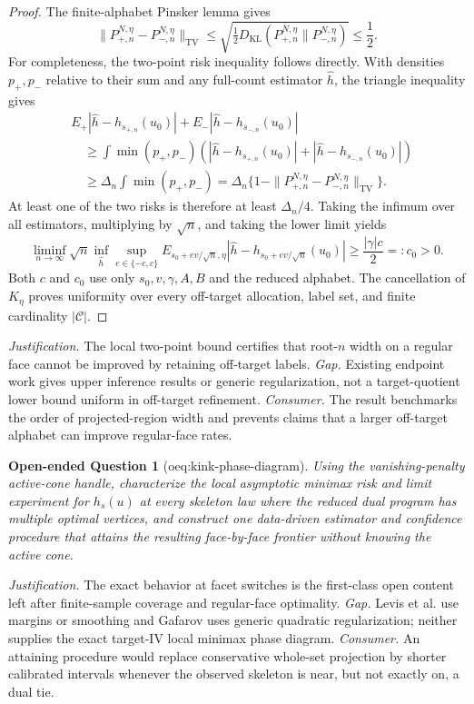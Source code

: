 \documentclass{article}
\newtheorem{openendedquestion}{Open-ended Question}
\begin{document}
\begin{proof}
The finite-alphabet Pinsker lemma gives
\[
\|P_{+,n}^{N,\eta}-P_{-,n}^{N,\eta}\|_{\mathrm{TV}}
\le\sqrt{\tfrac12D_{\mathrm{KL}}(P_{+,n}^{N,\eta}\|P_{-,n}^{N,\eta})}
\le\frac12.
\]
For completeness, the two-point risk inequality follows directly.  With densities \(p_+,p_-\) relative to their sum and any full-count estimator \(\widehat h\), the triangle inequality gives
\[
\begin{aligned}
&E_+|\widehat h-h_{s_{+,n}}(u_0)|+E_-|\widehat h-h_{s_{-,n}}(u_0)|\\
&\quad\ge
\int\min(p_+,p_-)
\left(|\widehat h-h_{s_{+,n}}(u_0)|+|\widehat h-h_{s_{-,n}}(u_0)|\right)\\
&\quad\ge \Delta_n\int\min(p_+,p_-)
=\Delta_n\{1-\|P_{+,n}^{N,\eta}-P_{-,n}^{N,\eta}\|_{\mathrm{TV}}\}.
\end{aligned}
\]
At least one of the two risks is therefore at least \(\Delta_n/4\).  Taking the infimum over all estimators, multiplying by \(\sqrt n\), and taking the lower limit yields
\[
\liminf_{n\to\infty}\sqrt n\inf_{\widehat h}
\sup_{e\in\{-c,c\}}E_{s_0+ev/\sqrt n,\eta}
|\widehat h-h_{s_0+ev/\sqrt n}(u_0)|
\ge\frac{|\gamma|c}{2}=:c_0>0.
\]
Both \(c\) and \(c_0\) use only \(s_0,v,\gamma,A,B\) and the reduced alphabet.  The cancellation of \(K_\eta\) proves uniformity over every off-target allocation, label set, and finite cardinality \(|\mathcal C|\).
\end{proof}
\par\smallskip\noindent \textit{Justification.} The local two-point bound certifies that root-\(n\) width on a regular face cannot be improved by retaining off-target labels. \textit{Gap.} Existing endpoint work gives upper inference results or generic regularization, not a target-quotient lower bound uniform in off-target refinement. \textit{Consumer.} The result benchmarks the order of projected-region width and prevents claims that a larger off-target alphabet can improve regular-face rates.

\begin{openendedquestion}[oeq:kink-phase-diagram]\label{oeq:kink-phase-diagram}
Using the vanishing-penalty active-cone handle, characterize the local asymptotic minimax risk and limit experiment for \(h_s(u)\) at every skeleton law where the reduced dual program has multiple optimal vertices, and construct one data-driven estimator and confidence procedure that attains the resulting face-by-face frontier without knowing the active cone.
\end{openendedquestion}
\par\smallskip\noindent \textit{Justification.} The exact behavior at facet switches is the first-class open content left after finite-sample coverage and regular-face optimality. \textit{Gap.} Levis et al. use margins or smoothing and Gafarov uses generic quadratic regularization; neither supplies the exact target-IV local minimax phase diagram. \textit{Consumer.} An attaining procedure would replace conservative whole-set projection by shorter calibrated intervals whenever the observed skeleton is near, but not exactly on, a dual tie.
\end{document}

